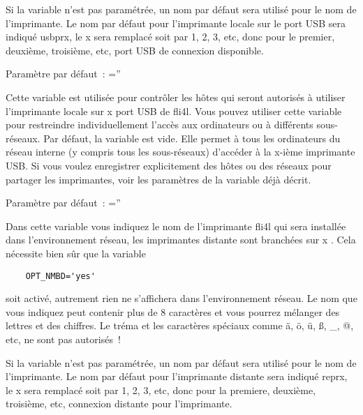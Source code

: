 \begin{description}
    Si la variable n'est pas paramétrée, un nom par défaut sera utilisé pour le
    nom de l'imprimante. Le nom par défaut pour l'imprimante locale sur le port
    USB sera indiqué usbprx, le x sera remplacé soit par 1, 2, 3, etc, donc
    pour le premier, deuxième, troisième, etc, port USB de connexion disponible.

    Paramètre par défaut~: =''



    Cette variable est utilisée pour contrôler les hôtes qui seront autorisés
    à utiliser l'imprimante locale sur x port USB de fli4l. Vous pouvez utiliser
    cette variable pour restreindre individuellement l'accès aux ordinateurs ou
    à différents sous-réseaux. Par défaut, la variable est vide. Elle permet à
    tous les ordinateurs du réseau interne (y compris tous les sous-réseaux)
    d'accéder à la x-ième imprimante USB.
    Si vous voulez enregistrer explicitement des hôtes ou des réseaux pour
    partager les imprimantes, voir les paramètres de la variable
     déjà décrit.

    Paramètre par défaut~: =''



    Dans cette variable vous indiquez le nom de l'imprimante fli4l qui sera
    installée dans l'environnement réseau, les imprimantes distante sont branchées
    sur x . Cela nécessite
    bien sûr que la variable

\begin{example}
\begin{verbatim}
    OPT_NMBD='yes'
\end{verbatim}
\end{example}

    soit activé, autrement rien ne s'affichera dans l'environnement réseau. Le
    nom que vous indiquez peut contenir plus de 8 caractères et vous pourrez
    mélanger des lettres et des chiffres. Le tréma et les caractères spéciaux
    comme ä, ö, ü, ß, \_, @, etc, ne sont pas autorisés~!

    Si la variable n'est pas paramétrée, un nom par défaut sera utilisé pour le
    nom de l'imprimante. Le nom par défaut pour l'imprimante distante sera
    indiqué reprx, le x sera remplacé soit par 1, 2, 3, etc, donc pour
    la premiere, deuxième, troisième, etc, connexion distante pour l'imprimante.


\end{description}

